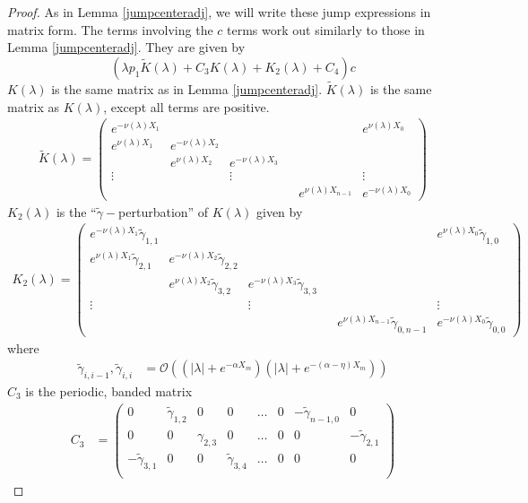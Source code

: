 \documentclass[thesis.tex]{subfiles}
\begin{document}
\begin{lemma}
\begin{proof}
As in Lemma \ref{jumpcenteradj}, we will write these jump expressions in matrix form. The terms involving the $c$ terms work out similarly to those in Lemma \ref{jumpcenteradj}. They are given by
\[
(\lambda p_1 \tilde{K}(\lambda) + C_3 K(\lambda) + K_2(\lambda) + C_4 )c
\]
$K(\lambda)$ is the same matrix as in Lemma \ref{jumpcenteradj}. $\tilde{K}(\lambda)$ is the same matrix as $K(\lambda)$, except all terms are positive.
\begin{align*}
\tilde{K}(\lambda) =  
\begin{pmatrix}
e^{-\nu(\lambda)X_1} & & & & & e^{\nu(\lambda)X_0} \\
e^{\nu(\lambda)X_1} & e^{-\nu(\lambda)X_2} \\
& e^{\nu(\lambda)X_2} & e^{-\nu(\lambda)X_3} \\
\vdots & & \vdots & &&  \vdots \\
& & & & e^{\nu(\lambda)X_{n-1}} & e^{-\nu(\lambda)X_0} 
\end{pmatrix}
\end{align*}
$K_2(\lambda)$ is the ``$\tilde{\gamma}-$perturbation'' of $K(\lambda)$ given by
\begin{align*}
K_2(\lambda) =  
\begin{pmatrix}
e^{-\nu(\lambda)X_1} \tilde{\gamma}_{1,1} & & & & & e^{\nu(\lambda)X_0}\tilde{\gamma}_{1,0} \\
e^{\nu(\lambda)X_1}\tilde{\gamma}_{2,1} & e^{-\nu(\lambda)X_2}\tilde{\gamma}_{2,2} \\
& e^{\nu(\lambda)X_2}\tilde{\gamma}_{3,2} & e^{-\nu(\lambda)X_3}\tilde{\gamma}_{3,3} \\
\vdots & & \vdots & &&  \vdots \\
& & & & e^{\nu(\lambda)X_{n-1}}\tilde{\gamma}_{0,n-1} & e^{-\nu(\lambda)X_0}\tilde{\gamma}_{0,0} 
\end{pmatrix}
\end{align*}
where 
\begin{align*}
\tilde{\gamma}_{i,i-1}, \tilde{\gamma}_{i,i} &= \mathcal{O}((|\lambda| + e^{-\alpha X_m})(|\lambda| + e^{-(\alpha - \eta) X_m}))
\end{align*}
$C_3$ is the periodic, banded matrix
\begin{align*}
C_3 &= \begin{pmatrix}
0 & \tilde{\gamma}_{1,2} & 0 & 0 & \dots & 0 & -\tilde{\gamma}_{n-1,0} & 0 \\
0 & 0 & \gamma_{2,3} & 0 & \dots & 0 & 0 & -\tilde{\gamma}_{2,1} \\
-\tilde{\gamma}_{3,1} & 0 & 0 & \tilde{\gamma}_{3,4} & \dots & 0 & 0 & 0 \\

\end{pmatrix}
\end{align*}
\end{proof}
\end{lemma}
\end{document}
